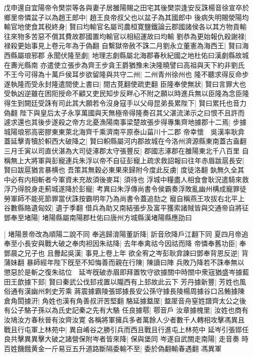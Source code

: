 戊申還自宜陽帝令樊崇等各與妻子居雒陽賜之田宅其後樊崇逢安反誅楊音徐宣卒於鄉里帝憐盆子以為趙王郎中|{
	趙王良帝叔父也以盆子為其國郎中}
後病失明賜滎陽均輸官地使食其税終身|{
	賢曰均輸官名屬司農桓寛鹽鐵論云郡國諸侯各以其方物貢輸往來物多苦惡不償其費故郡國置均輸官以相紹運故曰均輸}
劉恭為更始報仇殺謝禄|{
	禄殺更始事見上卷元年為于偽翻}
自繫獄帝赦不誅二月劉永立董憲為海西王|{
	賢曰海西縣屬琅邪郡}
永聞伏隆至劇|{
	地理志劇縣屬北海郡春秋紀國之地杜佑曰漢劇縣故城在夀光縣南}
亦遣使立張步為齊王步貪王爵猶豫未決隆曉譬曰高祖與天下約非劉氏不王今可得為十萬戶侯耳步欲留隆與共守二州|{
	二州青州徐州也}
隆不聽求得反命步遂執隆而受永封隆遣間使上書曰|{
	間古莧翻使疏吏翻}
臣隆奉使無狀|{
	賢曰言罪大也}
受執凶逆雖在困阨授命不顧又吏民知步反畔心不附之願以時進兵無以臣隆為念臣隆得生到闕廷受誅有司此其大願若令沒身寇手以父母昆弟長累陛下|{
	賢曰累托也音力偽翻}
陛下與皇后太子永享萬國與天無極帝得隆奏召其父湛流涕示之曰恨不且許而遽求還也其後步遂殺之帝方北憂漁陽南事梁楚故張步得專集齊地據郡十二焉|{
	步據城陽琅邪高密膠東東萊北海齊千乘濟南平原泰山菑川十二郡}
帝幸懷　吳漢率耿弇蓋延擊青犢於軹西大破降之|{
	賢曰軹縣屬河内郡故城在今洛州濟源縣東南蓋古盍翻}
三月壬寅以司直伏湛為大司徒涿郡太守張豐反|{
	郡國志涿郡在雒陽東北千八百里}
自稱無上大將軍與彭寵連兵朱浮以帝不自征彭寵上疏求救詔報曰往年赤眉跋扈長安|{
	賢曰跋扈猶言暴横也}
吾策其無穀必東果來歸附今度此反虜|{
	度徒洛翻}
埶無久全其中必有内相斬者今軍資未充故須後麥耳|{
	須待也}
浮城中糧盡人相食會耿況遣騎來救浮乃得脱身走薊城遂降於彭寵|{
	考異曰朱浮傳尚書令侯霸奏浮敗亂幽州構成寵罪徒勞軍師不能死節罪當伏誅按霸明年乃為尚書令蓋追劾之}
寵自稱燕王攻拔右北平上谷數縣賂遺匈奴|{
	遺于季翻}
借兵為助又南結張步及富平獲索諸賊皆與交通帝自將征鄧奉至堵陽|{
	堵陽縣屬南陽郡杜佑曰唐州方城縣漢堵陽縣應劭曰}


|{
	堵陽景帝改為順陽二說不同}
奉逃歸淯陽董訢降|{
	訢音欣降戶江翻下同}
夏四月帝追奉至小長安與戰大破之奉肉袒因朱祜降|{
	去年奉禽祜今因祜而降}
帝憐奉舊功臣|{
	奉鄧晨之兄子也}
且釁起吳漢|{
	事見上卷上年}
欲全宥之岑彭耿弇諫曰鄧奉背恩反逆|{
	背蒲妹翻}
暴師經年陛下旣至不知悔善而親在行陳|{
	陳讀曰陣}
兵敗乃降若不誅奉無以懲惡於是斬之復朱祜位　延岑旣破赤眉即拜置牧守欲據關中時關中衆宼猶盛岑據藍田王歆據下邽|{
	賢曰秦武公伐邽戎置以隴西有上邽故此云下}
芳丹據新豐|{
	芳姓也風俗通有漢幽州刺史芳乘}
蔣震據霸陵張邯據長安公孫守據長陵楊周據谷口呂鮪據陳倉角閎據汧|{
	角姓也漢有角善叔汧苦堅翻}
駱延據盩厔|{
	盩厔音舟窒姓譜齊太公之後有公子駱子孫以為氏史記秦之先有大駱}
任良據鄠|{
	鄠音戶}
汝章據槐里|{
	汝姓也商有汝鳩汝方春秋晉有汝齊汝寛}
各稱將軍擁兵多者萬餘人少者數千人轉相攻擊馮異且戰且行屯軍上林苑中|{
	異自崤谷之勝引兵而西且戰且行進屯上林苑中}
延岑引張邯任良共擊異異擊大破之諸營保附岑者皆來降|{
	保與堡同}
岑遂自武關走南陽|{
	走音奏}
時百姓饑餓黄金一斤易豆五升道路斷隔委輸不至|{
	委於偽翻輸春遇翻}
馮異軍

